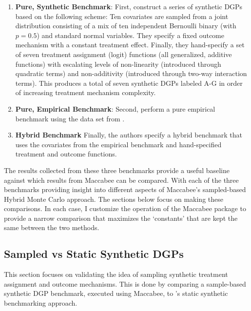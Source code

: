 \documentclass[../main.tex]{subfiles}
\begin{document}
\begin{enumerate}
    \item \textbf{Pure, Synthetic Benchmark}: First, \citeauthor{Diamond2012GeneticStudies} construct a series of synthetic DGPs based on the following scheme: Ten covariates are sampled from a joint distribution consisting of a mix of ten independent Bernoulli binary (with $p=0.5$) and standard normal variables. They specify a fixed outcome mechanism with a constant treatment effect. Finally, they hand-specify a set of seven treatment assignment (logit) functions (all generalized, additive functions) with escalating levels of non-linearity (introduced through quadratic terms) and non-additivity (introduced through two-way interaction terms). This produces a total of seven synthetic DGPs labeled A-G in order of increasing treatment mechanism complexity.
    
    \item \textbf{Pure, Empirical Benchmark}: Second, \citeauthor{Diamond2012GeneticStudies} perform a pure empirical benchmark using the data set from \textcite{Lalonde1986EvaluatingData}.
    
    \item \textbf{Hybrid Benchmark} Finally, the authors specify a hybrid benchmark that uses the covariates from the \textcite{Lalonde1986EvaluatingData} empirical benchmark and hand-specified treatment and outcome functions.
\end{enumerate}

The results collected from these three benchmarks provide a useful baseline against which results from Maccabee can be compared. With each of the three benchmarks providing insight into different aspects of Maccabee's sampled-based Hybrid Monte Carlo approach. The sections below focus on making these comparisons. In each case, I customize the operation of the Maccabee package to provide a narrow comparison that maximizes the `constants' that are kept the same between the two methods.

\subsection{Sampled vs Static Synthetic DGPs}

This section focuses on validating the idea of sampling synthetic treatment assignment and outcome mechanisms. This is done by comparing a sample-based synthetic DGP benchmark, executed using Maccabee, to \citeauthor{Diamond2012GeneticStudies}'s static synthetic benchmarking approach. 
\end{document}
